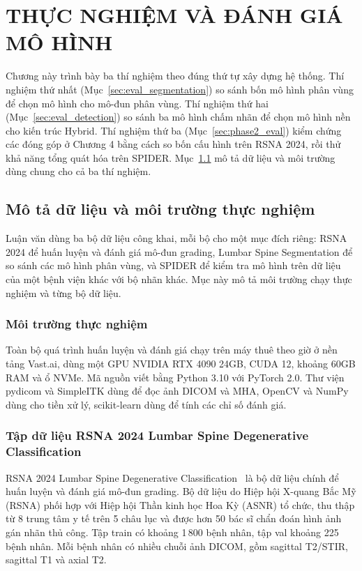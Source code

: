 \chapter{THỰC NGHIỆM VÀ ĐÁNH GIÁ MÔ HÌNH}

Chương này trình bày ba thí nghiệm theo đúng thứ tự xây dựng hệ thống. Thí nghiệm thứ nhất (Mục~\ref{sec:eval_segmentation}) so sánh bốn mô hình phân vùng để chọn mô hình cho mô-đun phân vùng. Thí nghiệm thứ hai (Mục~\ref{sec:eval_detection}) so sánh ba mô hình chấm nhãn để chọn mô hình nền cho kiến trúc Hybrid. Thí nghiệm thứ ba (Mục~\ref{sec:phase2_eval}) kiểm chứng các đóng góp ở Chương 4 bằng cách so bốn cấu hình trên RSNA 2024, rồi thử khả năng tổng quát hóa trên SPIDER. Mục~\ref{sec:data_env} mô tả dữ liệu và môi trường dùng chung cho cả ba thí nghiệm.

\section{Mô tả dữ liệu và môi trường thực nghiệm}
\label{sec:data_env}

Luận văn dùng ba bộ dữ liệu công khai, mỗi bộ cho một mục đích riêng: RSNA 2024 để huấn luyện và đánh giá mô-đun grading, Lumbar Spine Segmentation để so sánh các mô hình phân vùng, và SPIDER để kiểm tra mô hình trên dữ liệu của một bệnh viện khác với bộ nhãn khác. Mục này mô tả môi trường chạy thực nghiệm và từng bộ dữ liệu.

\subsection{Môi trường thực nghiệm}
Toàn bộ quá trình huấn luyện và đánh giá chạy trên máy thuê theo giờ ở nền tảng Vast.ai, dùng một GPU NVIDIA RTX 4090 24GB, CUDA 12, khoảng 60GB RAM và ổ NVMe. Mã nguồn viết bằng Python 3.10 với PyTorch 2.0. Thư viện pydicom và SimpleITK dùng để đọc ảnh DICOM và MHA, OpenCV và NumPy dùng cho tiền xử lý, scikit-learn dùng để tính các chỉ số đánh giá.

\subsection{Tập dữ liệu RSNA 2024 Lumbar Spine Degenerative Classification}
RSNA 2024 Lumbar Spine Degenerative Classification~\cite{rsna2024dataset} là bộ dữ liệu chính để huấn luyện và đánh giá mô-đun grading. Bộ dữ liệu do Hiệp hội X-quang Bắc Mỹ (RSNA) phối hợp với Hiệp hội Thần kinh học Hoa Kỳ (ASNR) tổ chức, thu thập từ 8 trung tâm y tế trên 5 châu lục và được hơn 50 bác sĩ chẩn đoán hình ảnh gán nhãn thủ công. Tập train có khoảng 1\,800 bệnh nhân, tập val khoảng 225 bệnh nhân. Mỗi bệnh nhân có nhiều chuỗi ảnh DICOM, gồm sagittal T2/STIR, sagittal T1 và axial T2.

